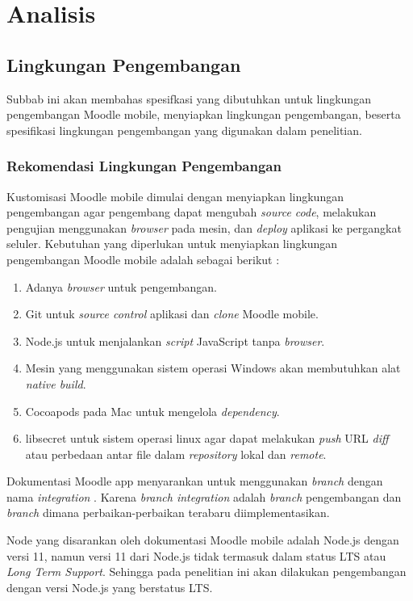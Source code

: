 \chapter{Analisis}
\label{chap:analsia}

\section{Lingkungan Pengembangan}
 Subbab ini akan membahas spesifkasi yang dibutuhkan untuk lingkungan pengembangan Moodle mobile, menyiapkan lingkungan pengembangan, beserta spesifikasi lingkungan pengembangan yang digunakan dalam penelitian.

\subsection{Rekomendasi Lingkungan Pengembangan}
Kustomisasi Moodle mobile dimulai dengan menyiapkan lingkungan pengembangan agar pengembang dapat mengubah \textit{source code}, melakukan pengujian menggunakan \textit{browser} pada mesin, dan \textit{deploy} aplikasi ke pergangkat seluler. Kebutuhan yang diperlukan untuk menyiapkan lingkungan pengembangan Moodle mobile adalah sebagai berikut : \cite{moodle:dev}

\begin{enumerate}
	\item Adanya \textit{browser} untuk pengembangan.
	\item Git untuk \textit{source control} aplikasi dan \textit{clone} Moodle mobile.
	\item Node.js untuk menjalankan \textit{script} JavaScript tanpa \textit{browser}.
	\item Mesin yang menggunakan sistem operasi Windows akan membutuhkan alat \textit{native build}.
	\item Cocoapods pada Mac untuk mengelola \textit{dependency}.
	\item libsecret untuk sistem operasi linux agar dapat melakukan \textit{push} URL \textit{diff} atau perbedaan antar file dalam \textit{repository} lokal dan \textit{remote}.
\end{enumerate}

Dokumentasi Moodle app menyarankan untuk menggunakan \textit{branch} dengan nama \textit{integration} \cite{moodle:dev}. Karena \textit{branch integration} adalah \textit{branch} pengembangan dan \textit{branch} dimana perbaikan-perbaikan terabaru diimplementasikan.

Node yang disarankan oleh dokumentasi Moodle mobile adalah Node.js dengan versi 11\cite{moodle:dev}, namun versi 11 dari Node.js tidak termasuk dalam status LTS atau \textit{Long Term Support}\cite{nodejs:status}. Sehingga pada penelitian ini akan dilakukan pengembangan dengan versi Node.js yang berstatus LTS.

